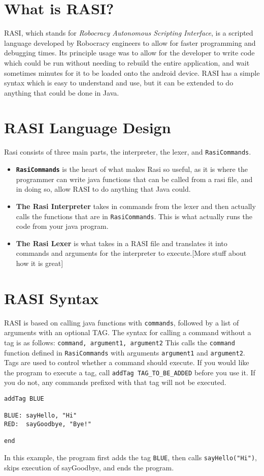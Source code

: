 \documentclass{article}
\begin{document}
\section{What is RASI?}
RASI, which stands for \textit{Robocracy Autonomous Scripting Interface}, is a scripted language developed by Robocracy engineers to allow for faster programming and debugging times. Its principle usage was to allow for the developer to write code which could be run without needing to rebuild the entire application, and wait sometimes minutes for it to be loaded onto the android device. RASI has a simple syntax which is easy to understand and use, but it can be extended to do anything that could be done in Java.

\section{RASI Language Design}
Rasi consists of three main parts, the interpreter, the lexer, and \texttt{RasiCommands}.
\begin{itemize}
  \item \textbf{\texttt{RasiCommands}} is the heart of what makes Rasi so useful, as it is where the programmer can write java functions that can be called from a rasi file, and in doing so, allow RASI to do anything that Java could.
  \item \textbf{The Rasi Interpreter} takes in commands from the lexer and then actually calls the functions that are in \texttt{RasiCommands}. This is what actually runs the code from your java program.
  \item \textbf{The Rasi Lexer} is what takes in a RASI file and translates it into commands and arguments for the interpreter to execute.[More stuff about how it is great]
\end{itemize}

\section{RASI Syntax}
RASI is based on calling java functions with \texttt{commands}, followed by a list of arguments with an optional TAG.
The syntax for calling a command without a tag is as follows: \texttt{command, argument1, argument2} This calls the \texttt{command} function defined in \texttt{RasiCommands} with arguments \texttt{argument1} and \texttt{argument2}.
Tags are used to control whether a command should execute. If you would like the program to execute a tag, call \texttt{addTag TAG\_TO\_BE\_ADDED} before you use it. If you do not, any commands prefixed with that tag will not be executed.

\begin{verbatim}
addTag BLUE

BLUE: sayHello, "Hi"
RED:  sayGoodbye, "Bye!"

end
\end{verbatim}
In this example, the program first adds the tag \texttt{BLUE}, then calls \texttt{sayHello("Hi")}, skips execution of sayGoodbye, and ends the program.
\end{document}
